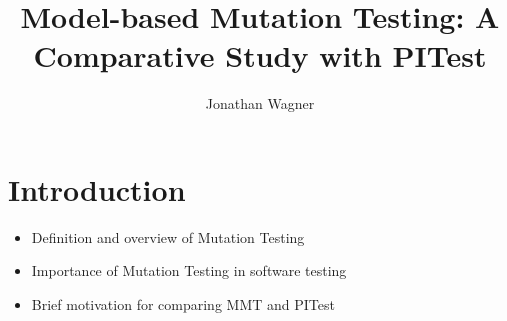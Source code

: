 \documentclass[sigplan, nonacm]{acmart}
\begin{document}
\title{Model-based Mutation Testing: A Comparative Study with PITest}

\author{Jonathan Wagner}

\maketitle

\section{Introduction}
\begin{itemize}
    \item Definition and overview of Mutation Testing
    \item Importance of Mutation Testing in software testing
    \item Brief motivation for comparing MMT and PITest
\end{itemize}
\end{document}
